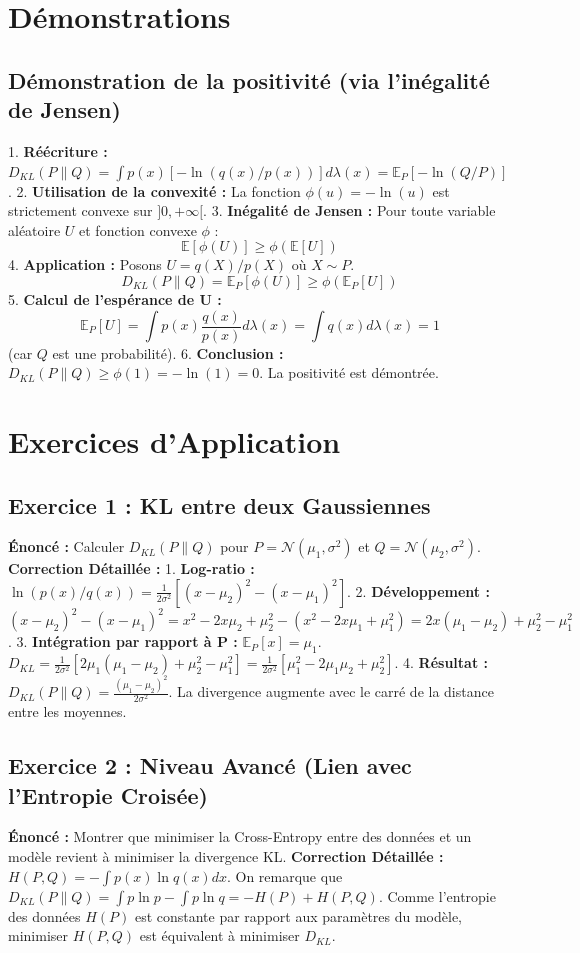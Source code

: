\documentclass[11pt,a4paper]{article}
\begin{document}
\section{Démonstrations}

\subsection{Démonstration de la positivité (via l'inégalité de Jensen)}

1. \textbf{Réécriture :} $D_{KL}(P \| Q) = \int p(x) [-\ln(q(x)/p(x))] d\lambda(x) = \mathbb{E}_P [ -\ln(Q/P) ]$.
2. \textbf{Utilisation de la convexité :} La fonction $\phi(u) = -\ln(u)$ est strictement convexe sur $]0, +\infty[$.
3. \textbf{Inégalité de Jensen :} Pour toute variable aléatoire $U$ et fonction convexe $\phi$ :
   $$\mathbb{E}[\phi(U)] \ge \phi(\mathbb{E}[U])$$
4. \textbf{Application :} Posons $U = q(X)/p(X)$ où $X \sim P$.
   $$D_{KL}(P \| Q) = \mathbb{E}_P [ \phi(U) ] \ge \phi(\mathbb{E}_P[U])$$
5. \textbf{Calcul de l'espérance de U :}
   $$\mathbb{E}_P[U] = \int p(x) \frac{q(x)}{p(x)} d\lambda(x) = \int q(x) d\lambda(x) = 1$$ (car $Q$ est une probabilité).
6. \textbf{Conclusion :}
   $D_{KL}(P \| Q) \ge \phi(1) = -\ln(1) = 0$.
   La positivité est démontrée.

\section{Exercices d'Application}

\subsection{Exercice 1 : KL entre deux Gaussiennes}
\textbf{Énoncé :} Calculer $D_{KL}(P \| Q)$ pour $P = \mathcal{N}(\mu_1, \sigma^2)$ et $Q = \mathcal{N}(\mu_2, \sigma^2)$.
\textbf{Correction Détaillée :}
1. \textbf{Log-ratio :} $\ln(p(x)/q(x)) = \frac{1}{2\sigma^2} [ (x-\mu_2)^2 - (x-\mu_1)^2 ]$.
2. \textbf{Développement :} $(x-\mu_2)^2 - (x-\mu_1)^2 = x^2 - 2x\mu_2 + \mu_2^2 - (x^2 - 2x\mu_1 + \mu_1^2) = 2x(\mu_1 - \mu_2) + \mu_2^2 - \mu_1^2$.
3. \textbf{Intégration par rapport à P :} $\mathbb{E}_P[x] = \mu_1$.
   $D_{KL} = \frac{1}{2\sigma^2} [ 2\mu_1(\mu_1 - \mu_2) + \mu_2^2 - \mu_1^2 ] = \frac{1}{2\sigma^2} [ \mu_1^2 - 2\mu_1\mu_2 + \mu_2^2 ]$.
4. \textbf{Résultat :} $D_{KL}(P \| Q) = \frac{(\mu_1 - \mu_2)^2}{2\sigma^2}$.
La divergence augmente avec le carré de la distance entre les moyennes.

\subsection{Exercice 2 : Niveau Avancé (Lien avec l'Entropie Croisée)}
\textbf{Énoncé :} Montrer que minimiser la Cross-Entropy entre des données et un modèle revient à minimiser la divergence KL.
\textbf{Correction Détaillée :}
$H(P, Q) = -\int p(x) \ln q(x) dx$.
On remarque que $D_{KL}(P \| Q) = \int p \ln p - \int p \ln q = -H(P) + H(P, Q)$.
Comme l'entropie des données $H(P)$ est constante par rapport aux paramètres du modèle, minimiser $H(P, Q)$ est équivalent à minimiser $D_{KL}$.
\end{document}

